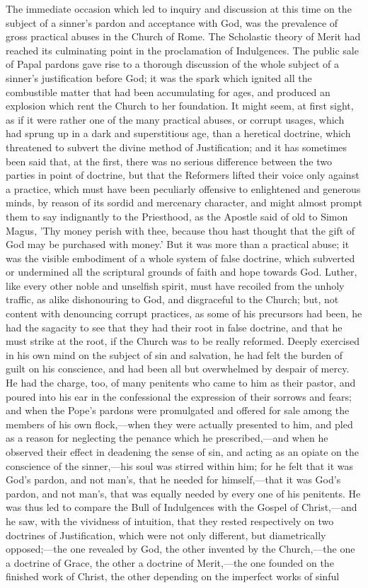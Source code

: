 \documentclass[
]{book}
\begin{document}
The immediate occasion which led to inquiry and discussion at this time on the subject of a sinner's pardon and acceptance with God, was the prevalence of gross practical abuses in the Church of Rome. The Scholastic theory of Merit had reached its culminating point in the proclamation of Indulgences. The public sale of Papal pardons gave rise to a thorough discussion of the whole subject of a sinner's justification before God; it was the spark which ignited all the combustible matter that had been accumulating for ages, and produced an explosion which rent the Church to her foundation. It might seem, at first sight, as if it were rather one of the many practical abuses, or corrupt usages, which had sprung up in a dark and superstitious age, than a heretical doctrine, which threatened to subvert the divine method of Justification; and it has sometimes been said that, at the first, there was no serious difference between the two parties in point of doctrine, but that the Reformers lifted their voice only against a practice, which must have been peculiarly offensive to enlightened and generous minds, by reason of its sordid and mercenary character, and might almost prompt them to say indignantly to the Priesthood, as the Apostle said of old to Simon Magus, 'Thy money perish with thee, because thou hast thought that the gift of God may be purchased with money.' But it was more than a practical abuse; it was the visible embodiment of a whole system of false doctrine, which subverted or undermined all the scriptural grounds of faith and hope towards God. Luther, like every other noble and unselfish spirit, must have recoiled from the unholy traffic, as alike dishonouring to God, and disgraceful to the Church; but, not content with denouncing corrupt practices, as some of his precursors had been, he had the sagacity to see that they had their root in false doctrine, and that he must strike at the root, if the Church was to be really reformed. Deeply exercised in his own mind on the subject of sin and salvation, he had felt the burden of guilt on his conscience, and had been all but overwhelmed by despair of mercy. He had the charge, too, of many penitents who came to him as their pastor, and poured into his ear in the confessional the expression of their sorrows and fears; and when the Pope's pardons were promulgated and offered for sale among the members of his own flock,---when they were actually presented to him, and pled as a reason for neglecting the penance which he prescribed,---and when he observed their effect in deadening the sense of sin, and acting as an opiate on the conscience of the sinner,---his soul was stirred within him; for he felt that it was God's pardon, and not man's, that he needed for himself,---that it was God's pardon, and not man's, that was equally needed by every one of his penitents. He was thus led to compare the Bull of Indulgences with the Gospel of Christ,---and he saw, with the vividness of intuition, that they rested respectively on two doctrines of Justification, which were not only different, but diametrically opposed;---the one revealed by God, the other invented by the Church,---the one a doctrine of Grace, the other a doctrine of Merit,---the one founded on the finished work of Christ, the other depending on the imperfect works of sinful 
\end{document}
